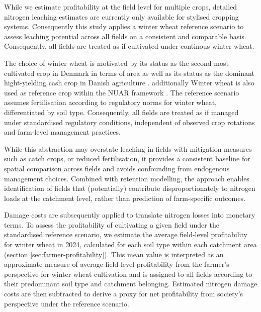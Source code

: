 \documentclass[12pt]{article}
\begin{document}
\label{sec:The Winter Wheat Reference Scenario}

While we estimate profitability at the field level for multiple crops, detailed nitrogen leaching estimates are currently only available for stylised cropping systems. Consequently this study applies a winter wheat reference scenario to assess leaching potential across all fields on a consistent and comparable basis. Consequently, all fields are treated as if cultivated under continous winter wheat.

  



The choice of winter wheat is motivated by its status as the second most cultivated crop in Denmark in terms of area as well as its status as the dominant hight-yielding cash crop in Danish agriculture \citep{bramsen2024}. additionally Winter wheat is also used as reference crop within the NUAR framework \citep{Eriksen2024}. The reference scenario assumes fertilisation according to regulatory norms for winter wheat, differentiated by soil type. Consequently, all fields are treated as if managed under standardised regulatory conditions, independent of observed crop rotations and farm-level management practices. 

While this abstraction may overstate leaching in fields with mitigation measures such as catch crops, or reduced fertilisation, it provides a consistent baseline for spatial comparison across fields and avoids confounding from endogenous management choices. Combined with retention modelling, the approach enables identification of fields that (potentially) contribute disproportionately to nitrogen loads at the catchment level, rather than prediction of farm-specific outcomes.



Damage costs are subsequently applied to translate nitrogen losses into monetary terms. To assess the profitability of cultivating a given field under the standardised reference scenario, we estimate the average field-level profitability for winter wheat in 2024, calculated for each soil type within each catchment area (section \ref{sec:farmer-profitability}). This mean value is interpreted as an approximate measure of average field-level profitability from the farmer's perspective for winter wheat cultivation and is assigned to all fields according to their predominant soil type and catchment belonging. 
Estimated nitrogen damage costs are then subtracted to derive a proxy for net profitability from society's perspective under the reference scenario.
\end{document}
